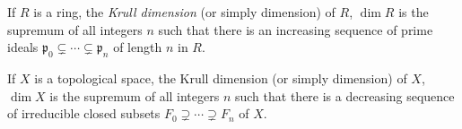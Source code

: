 \documentclass{article}
\begin{document}
If $R$ is a ring, the \emph{Krull dimension} (or simply dimension) of $R$, $\dim R$ is the supremum of all integers $n$ such that there is an increasing sequence of prime ideals $\mathfrak{p}_0 \subsetneq \cdots \subsetneq \mathfrak{p}_n$ of length $n$ in $R$.

If $X$ is a topological space, the Krull dimension (or simply dimension) of $X$, $\dim X$ is the supremum of all integers $n$ such that there is a decreasing sequence of irreducible closed subsets $F_0 \supsetneq \cdots \supsetneq F_n$ of $X$.
\end{document}
